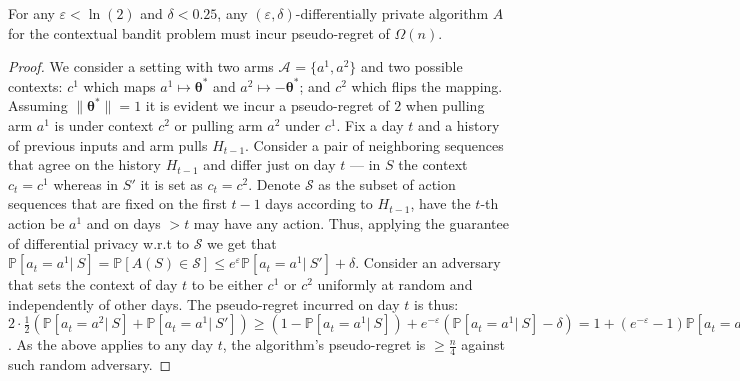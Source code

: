 \documentclass{article}
\renewcommand{\vec}[1]{\bm{#1}}
\renewcommand{\Pr}{\mathds{P}}
\newcommand{\Aset}[1]{\mathcal{A}_{#1}}
\begin{document}
\begin{claim}
\label{clm:standard_contextual_DP_implies_linear_regret}
For any $\varepsilon < \ln(2)$ and $\delta < 0.25$, any $(\varepsilon,\delta)$-differentially private algorithm $A$ for the contextual bandit problem must incur pseudo-regret of $\Omega(n)$.
\end{claim}
\begin{proof}
We consider a setting with two arms $\Aset{}=\{a^1,a^2\}$ and two possible contexts: $c^1$ which maps $a^1\mapsto \vec\theta^*$ and $a^2 \mapsto -\vec\theta^*$; and $c^2$ which flips the mapping. Assuming $\|\vec\theta^*\|=1$ it is evident we incur a pseudo-regret of $2$ when pulling arm $a^1$ is under context $c^2$ or pulling arm $a^2$ under $c^1$. Fix a day $t$ and a history of previous inputs and arm pulls $H_{t-1}$. Consider a pair of neighboring sequences that agree on the history $H_{t-1}$ and differ just on day $t$ --- in $S$ the context $c_t =c^1$ whereas in $S'$ it is set as $c_t =c^2$. Denote $\mathcal{S}$ as the subset of action sequences that are fixed on the first $t-1$ days according to $H_{t-1}$, have the $t$-th action be $a^1$ and on days $>t$ may have any action. Thus, applying the guarantee of differential privacy w.r.t to $\mathcal{S}$ we get that $\Pr[a_t = a^1 |~S] = \Pr[A(S)\in \mathcal{S}] \leq e^\varepsilon \Pr[a_t=a^1 |~S'] + \delta$. Consider an adversary that sets the context of day $t$ to be either $c^1$ or $c^2$ uniformly at random and independently of other days. The pseudo-regret incurred on day $t$ is thus: $2\cdot \tfrac 1 2 \left( \Pr[a_t=a^2|~S] + \Pr[a_t=a^1|~S'] \right)  \geq (1- \Pr[a_t=a^1|~S]) + e^{-\varepsilon}(\Pr[a_t=a^1|~S]-\delta) = 1 + (e^{-\varepsilon}-1)\Pr[a_t=a^2|~S] - \delta > 1 - 1\cdot \tfrac 1 2 - \tfrac 1 4 = \tfrac 1 4$. As the above applies to any day $t$,  the algorithm's pseudo-regret is $\geq \tfrac n 4$ against such random adversary.
\end{proof}
\end{document}
